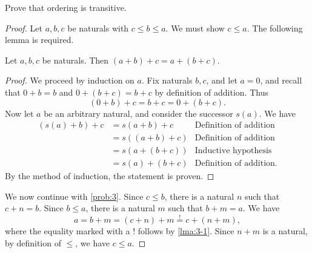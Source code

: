 \documentclass[11pt, letterpaper]{article}
\begin{document}
\begin{problem}\label{prob:3}
	Prove that ordering is transitive.
\end{problem}
\begin{proof}
	Let $a,b,c$ be naturals with $c\leq b\leq a$. We must show $c\leq a$. The following lemma is required.

	\begin{lemma}\label{lma:3-1}
		Let $a,b,c$ be naturals. Then $(a+b)+c=a+(b+c)$.
	\end{lemma}
	\begin{proof}
		We proceed by induction on $a$. Fix naturals $b,c$, and let $a=0$, and recall that $0+b=b$ and $0+(b+c)=b+c$ by definition of addition. Thus
		\[
			(0+b)+c = b+c = 0+(b+c)
		.\]
		Now let $a$ be an arbitrary natural, and consider the successor $s(a)$. We have
		\begin{align*}
			(s(a)+b)+c &=s(a+b)+c &\text{Definition of addition}\\
				   &=s((a+b)+c)&\text{Definition of addition}\\
				   &=s(a+(b+c))&\text{Inductive hypothesis}\\
				   &=s(a)+(b+c)&\text{Definition of addition}
		.\end{align*}
		By the method of induction, the statement is proven.
	\end{proof}
	We now continue with \cref{prob:3}. Since $c\leq b$, there is a natural $n$ such that $c+n=b$. Since $b\leq a$, there is a natural $m$ such that $b+m=a$. We have
	\[
		a=b+m = (c+n)+m \overset{!}{=}c+(n+m)
	,\]
	where the equality marked with a $!$ follows by \cref{lma:3-1}. Since $n+m$ is a natural, by definition of $\leq $, we have $c\leq a$.
\end{proof}
\end{document}

